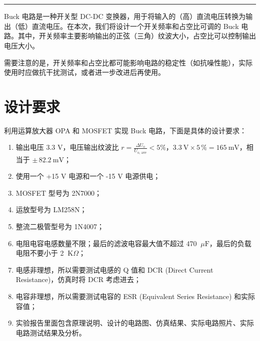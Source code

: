 \documentclass[UTF8]{article}
\def\kO{\ \mathrm{K}\Omega}
\def\uF{\ \mu\mathrm{F}}
\def\kO{\ \mathrm{K}\Omega}
\def\uF{\ \mu\mathrm{F}}
\theoremstyle{MyLineTheoremStyle} %
\theoremstyle{MyBlockTheoremStyle} %
\theoremstyle{MySubsubsectionStyle} %
\begin{document}
\setcounter{page}{81}

\begin{center}\large
    \vspace*{-0.8cm}
    \\\vspace{0.2cm}
    \\
\end{center}
\vspace{-0.5cm}
\noindent\rule{\textwidth}{0.075em}   %
\vspace{-1.0cm}

\setcounter{tocdepth}{2}  %
\noindent\tableofcontents\thispagestyle{fancy}   %
\newpage



Buck 电路是一种开关型 DC-DC 变换器，用于将输入的（高）直流电压转换为输出（低）直流电压。在本次，我们将设计一个开关频率和占空比可调的 Buck 电路。其中，开关频率主要影响输出的正弦（三角）纹波大小，占空比可以控制输出电压大小。

需要注意的是，开关频率和占空比都可能影响电路的稳定性（如抗噪性能），实际使用时应做抗干扰测试，或者进一步改进后再使用。


\section{设计要求}
利用运算放大器 OPA 和 MOSFET 实现 Buck 电路，下面是具体的设计要求：
\begin{enumerate}
\item 输出电压 3.3 V，电压输出纹波比 $r = \frac{\Delta U_{\text{o}}}{U_{\text{o, ave}}} < 5\%$，$3.3\ \mathrm{V}\times 5\,\% = 165\ \mathrm{mV}$，相当于 $\pm\, 82.2\ \mathrm{mV}$；
\item 使用一个 +15 V 电源和一个 -15 V 电源供电；
\item MOSFET 型号为 2N7000；
\item 运放型号为 LM258N；
\item 整流二极管型号为 1N4007；
\item 电阻电容电感数量不限；最后的滤波电容最大值不超过 470 $\uF$，最后的负载电阻不要小于 2 $\kO$；
\item 电感非理想，所以需要测试电感的 Q 值和 DCR (Direct Current Resistance)，仿真时将 DCR 考虑进去；
\item 电容非理想，所以需要测试电容的 ESR (Equivalent Series Resistance) 和实际容值；
\item 实验报告里面包含原理说明、设计的电路图、仿真结果、实际电路照片、实际电路测试结果及分析。
\end{enumerate}
\end{document}
